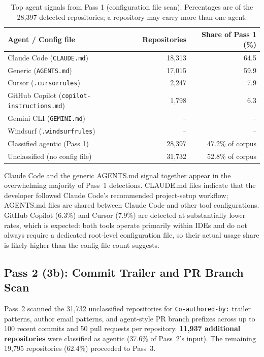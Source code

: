 \begin{table}[h]
\centering
\caption{Top agent signals from Pass 1 (configuration file scan). Percentages are of the 28,397 detected repositories; a repository may carry more than one agent.}
\label{tab:pass1_agents}
\begin{tabular}{@{}lrr@{}}
\toprule
Agent / Config file & Repositories & Share of Pass 1 (\%) \\
\midrule
Claude Code (\texttt{CLAUDE.md})            & 18,313 & 64.5 \\
Generic (\texttt{AGENTS.md})               & 17,015 & 59.9 \\
Cursor (\texttt{.cursorrules})             &  2,247 &  7.9 \\
GitHub Copilot (\texttt{copilot-instructions.md}) & 1,798 & 6.3 \\
Gemini CLI (\texttt{GEMINI.md})            &    --  &  --  \\
Windsurf (\texttt{.windsurfrules})         &    --  &  --  \\
\midrule
Classified agentic (Pass 1) & 28,397 & 47.2\% of corpus \\
Unclassified (no config file) & 31,732 & 52.8\% of corpus \\
\bottomrule
\end{tabular}
\end{table}

Claude Code and the generic AGENTS.md signal together appear in the overwhelming majority of Pass~1 detections. CLAUDE.md files indicate that the developer followed Claude Code's recommended project-setup workflow; AGENTS.md files are shared between Claude Code and other tool configurations. GitHub Copilot (6.3\%) and Cursor (7.9\%) are detected at substantially lower rates, which is expected: both tools operate primarily within IDEs and do not always require a dedicated root-level configuration file, so their actual usage share is likely higher than the config-file count suggests.

\subsection{Pass 2 (3b): Commit Trailer and PR Branch Scan}

Pass~2 scanned the 31,732 unclassified repositories for \texttt{Co-authored-by:} trailer patterns, author email patterns, and agent-style PR branch prefixes across up to 100 recent commits and 50 pull requests per repository. \textbf{11,937 additional repositories} were classified as agentic (37.6\% of Pass~2's input). The remaining 19,795 repositories (62.4\%) proceeded to Pass~3.

